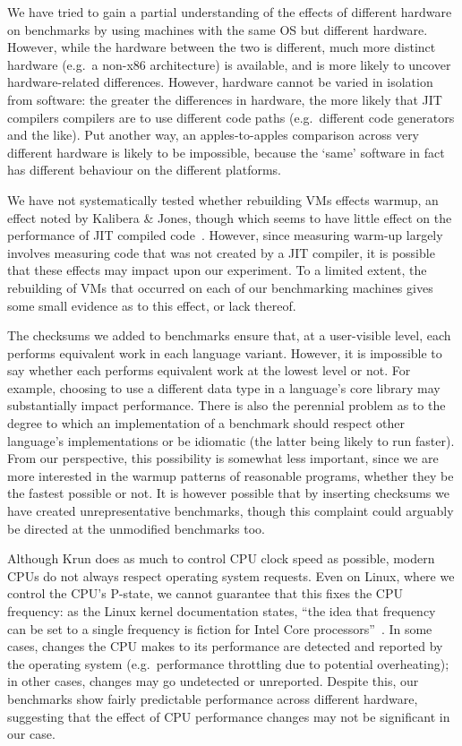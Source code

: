 \documentclass[preprint,numbers,10pt]{sigplanconf}
\newcommand{\kalibera}{Kalibera \& Jones\xspace}
\newcommand{\krun}{Krun\xspace}
\begin{document}
We have tried to gain a partial understanding of the effects of different
hardware on benchmarks by using machines with the same OS but
different hardware. However, while the hardware between the two is
different, much more distinct hardware (e.g.~a non-x86 architecture) is
available, and is more likely to uncover hardware-related differences.
However, hardware cannot be varied in isolation from software:
the greater the differences in hardware, the more likely that JIT compilers
compilers are to use different code paths (e.g.~different code generators and
the like). Put another way, an apples-to-apples comparison across very different
hardware is likely to be impossible, because the `same' software in fact has
different behaviour on the different platforms.

We have not systematically tested whether rebuilding VMs effects warmup, an
effect noted by \kalibera, though which seems to have little effect on
the performance of JIT compiled code~\cite{barrett15approaches}. However, since measuring warm-up largely
involves measuring code that was not created by a JIT compiler, it is possible
that these effects may impact upon our experiment. To a limited extent, the
rebuilding of VMs that occurred on each of our benchmarking machines gives
some small evidence as to this effect, or lack thereof.

The checksums we added to benchmarks ensure that, at a user-visible level, each
performs equivalent work in each language variant. However, it is impossible to
say whether each performs equivalent work at the lowest level or not. For
example, choosing to use a different data type in a language's core library may
substantially impact performance. There is also the perennial problem as to the
degree to which an implementation of a benchmark should respect other
language's implementations or be idiomatic (the latter being likely to
run faster). From our perspective, this possibility is somewhat less important,
since we are more interested in the warmup patterns of reasonable programs,
whether they be the fastest possible or not. It is however possible that by
inserting checksums we have created unrepresentative benchmarks, though
this complaint could arguably be directed at the unmodified benchmarks too.

 Although \krun does as much to control CPU clock speed as possible, modern CPUs
do not always respect operating system requests. Even on Linux, where we control
the CPU's P-state, we cannot guarantee that this fixes the CPU frequency: as
the Linux kernel documentation states, ``the idea that frequency can be set to a single
frequency is fiction for Intel Core processors''~\cite{pstate}. In
some cases, changes the CPU makes to its performance are detected and reported
by the operating system (e.g.~performance throttling due to potential
overheating); in other cases, changes may go undetected or unreported.
Despite this, our benchmarks show fairly predictable performance across
different hardware, suggesting that the effect of CPU performance changes may
not be significant in our case.
\end{document}

